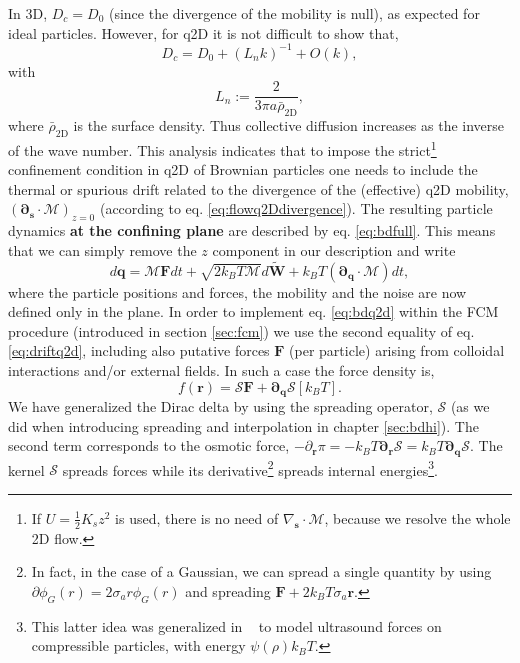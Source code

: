 \documentclass[twoside,openright,titlepage,numbers=noenddot,%
headinclude,footinclude,cleardoublepage=empty,abstract=on,
BCOR=5mm,fontsize=11pt, dvipsnames, paper=b5
]{scrreprt}
\renewcommand{\vec}[1]{\bm{#1}}
\newcommand{\tens}[1]{\bm{\mathcal{#1}}}
\newcommand{\oper}[1]{\mathcal{#1}}
\newcommand{\kT}{k_B T}
\newcommand{\half}{\frac{1}{2}}
\newcommand{\ppos}{q}
\newcommand{\fpos}{r}
\begin{document}
In 3D, $D_c = D_0$ (since the divergence of the mobility is null), as expected for ideal particles. However, for q2D it is not difficult to show \cite{Bleibel2017, Pelaez2018} that,
\begin{equation}
  D_c = D_0 + (L_nk)^{-1} + O(k),
\end{equation}
with
\begin{equation}
  L_n := \frac{2}{3\pi a\bar{\rho}_{\text{2D}}},
\end{equation}
where $\bar{\rho}_{\text{2D}}$ is the surface density. Thus collective diffusion increases as the inverse of the wave number.
This analysis indicates that  to impose the strict\footnote{If $U=\half K_sz^2$ is used, there is no need of $\nabla_{\vec{s}}\cdot\tens{M}$, because we resolve the whole 2D flow.} confinement condition in q2D of Brownian particles one needs to include the thermal or spurious drift related to the divergence of the (effective) q2D mobility, $(\vec{\partial}_{\vec{s}}\cdot\tens{M})_{z=0}$ (according to eq. \eqref{eq:flowq2Ddivergence}). The resulting particle dynamics \textbf{at the confining plane} are described by eq. \eqref{eq:bdfull}.
This means that we can simply remove the $z$ component in our description and write
\begin{equation}
  \label{eq:bdq2d}
  d\vec{\ppos} = \tens{M}\vec{F}dt + \sqrt{2\kT \tens{M}}d\vec{\widetilde{W}} + \kT\left(\vec{\partial}_{\vec{\ppos}}\cdot\tens{M}\right)dt,
\end{equation}
where the particle positions and forces, the mobility and the noise are now defined only in the plane.
In order to implement eq. \eqref{eq:bdq2d} within the \gls{FCM} procedure (introduced in section \ref{sec:fcm}) we use the second equality of eq. \eqref{eq:driftq2d}, including also putative forces $\vec{F}$ (per particle) arising from colloidal interactions and/or external fields. In such a case the force density is,
\begin{equation}
  f(\vec{\fpos}) = \oper{S}\vec{F} + \vec{\partial}_{\vec{\ppos}}\oper{S}\left[\kT\right].
\end{equation}
We have generalized the Dirac delta by using the spreading operator, $\oper{S}$ (as we did when introducing spreading and interpolation in chapter \ref{sec:bdhi}). The second term corresponds to the osmotic force, $-\partial_{\vec{\fpos}}\pi = -\kT\vec{\partial}_{\vec{\fpos}}\oper{S} = \kT\vec{\partial}_{\vec{\ppos}}\oper{S}$. The kernel $\oper{S}$ spreads forces while its derivative\footnote{In fact, in the case of a Gaussian, we can spread a single quantity by using $\partial\phi_G(r) = 2\sigma_ar\phi_G(r)$ and spreading $\vec{F} + 2\kT\sigma_a\vec{r}$.} spreads internal energies\footnote{This latter idea was generalized in ~\cite{Balboa2013} to model ultrasound forces on compressible particles, with energy $\psi(\rho)\kT$.}.
\end{document}
